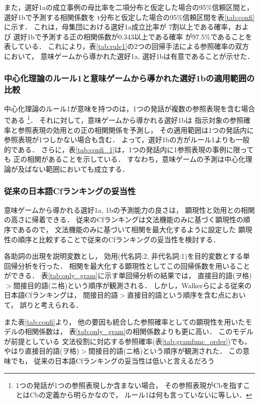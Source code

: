 また，選好1aの成立事例の母比率を二項分布と仮定した場合の95\%信頼区間と，
選好1bで予測する相関係数を
t分布と仮定した場合の95\%信頼区間を表\ref{tab:confi}に示す．
これは，母集団における選好1a成立比率が
7割以上である確率，および
選好1bで予測する正の相関係数が0.343以上である確率
が97.5\%であることを表している．
これにより，表\ref{tab:rule1}の2つの回帰手法による参照確率の双方において，
意味ゲームから導かれた選好1a, 選好1bは有意であることが示せた．

\subsubsection{中心化理論のルール1と意味ゲームから導かれた選好1bの適用範囲の比較}
中心化理論のルール1が意味を持つのは，1つの発話が複数の参照表現を含む場合である
\footnote{1つの発話が1つの参照表現しか含まない場合，
その参照表現がCbを指すことはCbの定義から明らかなので，
ルール1は何も言っていないに等しい．}．
それに対して，意味ゲームから導かれる選好1bは
指示対象の参照確率と参照表現の効用との正の相関関係を予測し，
その適用範囲は1つの発話内に参照表現が1つしかない場合も含む．
よって，選好1bの方がルール1よりも一般的である．
さらに，表\ref{tab:confi_1}は，1つの発話内に1参照表現の事例に限っても
正の相関があることを示している．
すなわち，意味ゲームの予測は中心化理論が及ばない範囲においても成立する．

\subsubsection{従来の日本語Cfランキングの妥当性}

意味ゲームから導かれる選好1a, 1bの予測能力の良さは，
顕現性と効用との相関の高さに帰着できる．
従来のCfランキングは文法機能のみに基づく顕現性の順序であるので，
文法機能のみに基づいて相関を最大化するように設定した
顕現性の順序と比較することで従来のCfランキングの妥当性を検討する．

各助詞の出現を説明変数とし，
効用(代名詞:2, 非代名詞:1)を目的変数とする単回帰分析を行った．
相関を最大化する顕現性としてこの回帰係数を用いることができる．
表\ref{tab:only_gram}に示す単回帰分析の結果では，
直接目的語(ヲ格)$>$間接目的語(ニ格)という順序が観測される．
しかし，Walkerら\citeyear{walker1994}による従来の日本語Cfランキングは，
間接目的語$>$直接目的語という順序を含む点において，
誤りと考えられる．

また表\ref{tab:confi}より，
他の要因も統合した参照確率としての顕現性を用いたモデルの相関係数は，
表\ref{tab:only_gram}の相関係数よりも更に高い．
このモデルが前提としている
文法役割に対応する参照確率(表\ref{tab:gramfunc_order})でも，
やはり直接目的語(ヲ格)$>$間接目的語(ニ格)という順序が観測された．
この意味でも，
従来の日本語Cfランキングの妥当性は低いと言えるだろう


